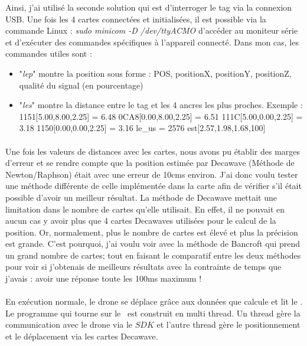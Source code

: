         Ainsi, j'ai utilisé la seconde solution qui est d'interroger le tag via la connexion USB. Une fois les 4 cartes connectées et initialisées, il est possible via la commande Linux : \textit{sudo minicom -D /dev/ttyACMO} d'accéder au moniteur série et d'exécuter des commandes spécifiques à l'appareil connecté. Dans mon cas, les commandes utiles sont :
        
        \begin{itemize}
            \item "\textit{lep}" montre la position sous forme : POS, positionX, positionY, positionZ, qualité du signal (en pourcentage)
            \item "\textit{les}" montre la distance entre le tag et les 4 ancres les plus proches. Exemple : 1151[5.00,8.00,2.25] = 6.48 0CA8[0.00,8.00,2.25] = 6.51 111C[5.00,0.00,2.25] = 3.18 1150[0.00,0.00,2.25] = 3.16 le\_us = 2576 est[2.57,1.98,1.68,100]
        \end{itemize}
        
        \paragraph*{}
        Une fois les valeurs de distances avec les cartes, nous avons pu établir des marges d'erreur et se rendre compte que la position estimée par Decawave (Méthode de Newton/Raphson) était avec une erreur de 10cms environ. J'ai donc voulu tester une méthode différente de celle implémentée dans la carte afin de vérifier s'il était possible d'avoir un meilleur résultat. La méthode de Decawave mettait une limitation dans le nombre de cartes qu'elle utilisait. En effet, il ne pouvait en aucun cas y avoir plus que 4 cartes Decawaves utilisées pour le calcul de la position. Or, normalement, plus le nombre de cartes est élevé et plus la précision est grande. C'est pourquoi, j'ai voulu voir avec la méthode de Bancroft qui prend un grand nombre de cartes; tout en faisant le comparatif entre les deux méthodes pour voir si j'obtenais de meilleurs résultats avec la contrainte de temps que j'avais : avoir une réponse toute les 100ms maximum !
        
        \paragraph*{}
        En exécution normale, le drone se déplace grâce aux données que calcule et lit le \rpi. Le programme qui tourne sur le \rpi ~est construit en multi thread. Un thread gère la communication avec le drone via le $SDK$ et l'autre thread gère le positionnement et le déplacement via les cartes Decawave.
        
